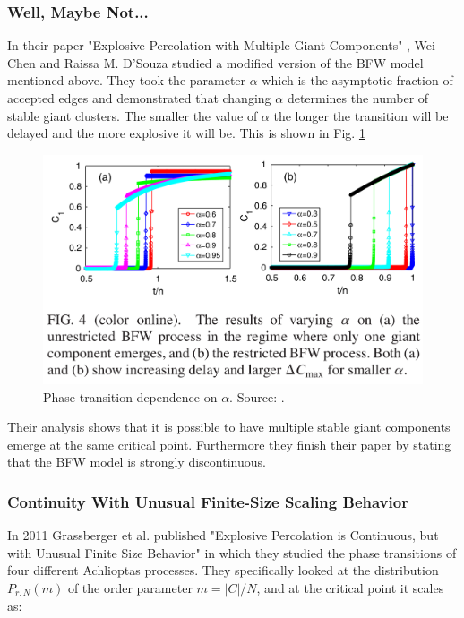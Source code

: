 \subsubsection{Well, Maybe Not...}
In their paper "Explosive Percolation with Multiple Giant Components" \cite{Chen_1}, Wei Chen and Raissa M. D’Souza studied a modified version of the BFW model mentioned above.
They took the parameter $\alpha$ which is the asymptotic fraction of accepted edges and demonstrated that changing $\alpha$ determines the number of stable giant clusters.
The smaller the value of $\alpha$ the longer the transition will be delayed and the more explosive it will be.
This is shown in Fig. \ref{fig:bfw_alpha_comparison}

\begin{figure}[H]
	\centering
	\includegraphics[width=350pt]{images/bfw_alpha_comparison.png}
	\caption{Phase transition dependence on $\alpha$. Source: \cite{Chen_1}.}
	\label{fig:bfw_alpha_comparison}
\end{figure}

Their analysis shows that it is possible to have multiple stable giant components emerge at the same critical point.
Furthermore they finish their paper by stating that the BFW model is strongly discontinuous.



\subsubsection{Continuity With Unusual Finite-Size Scaling Behavior}
In 2011 Grassberger et al. published "Explosive Percolation is Continuous, but with Unusual Finite Size Behavior" \cite{Grassberger_1} in which they studied the phase transitions of four different Achlioptas processes.
They specifically looked at the distribution $P_{r, N}(m)$ of the order parameter $m = |C| / N$, and at the critical point it scales as:


